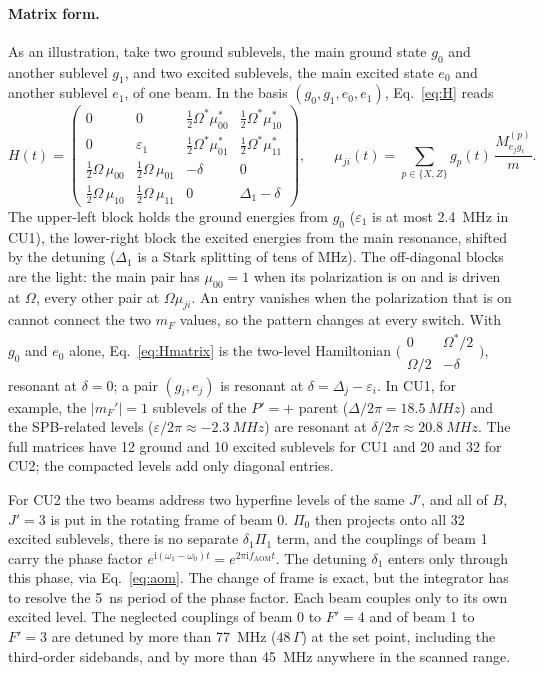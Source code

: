 \documentclass[11pt,a4paper,oneside]{report}
\newcommand{\fAOM}{f_{\mathrm{AOM}}}
\begin{document}
\paragraph{Matrix form.} As an illustration, take two ground sublevels, the main ground state $g_0$ and
another sublevel $g_1$, and two excited sublevels, the main excited state $e_0$ and another sublevel
$e_1$, of one beam. In the basis $(g_0,g_1,e_0,e_1)$, Eq.~\eqref{eq:H} reads
\begin{equation}
  H(t)=\begin{pmatrix}
    0 & 0 & \tfrac12\Omega^*\mu_{00}^* & \tfrac12\Omega^*\mu_{10}^*\\[2pt]
    0 & \varepsilon_1 & \tfrac12\Omega^*\mu_{01}^* & \tfrac12\Omega^*\mu_{11}^*\\[2pt]
    \tfrac12\Omega\,\mu_{00} & \tfrac12\Omega\,\mu_{01} & -\delta & 0\\[2pt]
    \tfrac12\Omega\,\mu_{10} & \tfrac12\Omega\,\mu_{11} & 0 & \Delta_1-\delta
  \end{pmatrix},\qquad
  \mu_{ji}(t)=\sum_{p\in\{X,Z\}}g_p(t)\,\frac{M^{(p)}_{e_jg_i}}{m}.
  \label{eq:Hmatrix}
\end{equation}
The upper-left block holds the ground energies from $g_0$ ($\varepsilon_1$ is at most \SI{2.4}{MHz}
in CU1), the lower-right block the excited energies from the main resonance, shifted by the detuning
($\Delta_1$ is a Stark splitting of tens of MHz). The off-diagonal blocks are the light: the main pair
has $\mu_{00}=1$ when its polarization is on and is driven at $\Omega$, every other pair at
$\Omega\mu_{ji}$. An entry vanishes when the polarization that is on cannot connect the two $m_F$
values, so the pattern changes at every switch. With $g_0$ and $e_0$ alone, Eq.~\eqref{eq:Hmatrix} is
the two-level Hamiltonian
$\bigl(\begin{smallmatrix}0&\Omega^*/2\\\Omega/2&-\delta\end{smallmatrix}\bigr)$, resonant at
$\delta=0$; a pair $(g_i,e_j)$ is resonant at $\delta=\Delta_j-\varepsilon_i$. In CU1, for example,
the $|m_F'|=1$ sublevels of the $P'=+$ parent ($\Delta/2\pi=\SI{18.5}{MHz}$) and the SPB-related levels
($\varepsilon/2\pi\approx-\SI{2.3}{MHz}$) are resonant at $\delta/2\pi\approx\SI{20.8}{MHz}$. The full
matrices have 12 ground and 10 excited sublevels for CU1 and 20 and 32 for CU2; the compacted levels
add only diagonal entries.

For CU2 the two beams address two hyperfine levels
of the same $J'$, and all of $B$, $J'=3$ is put in the rotating frame of beam 0. $\Pi_0$ then
projects onto all 32 excited sublevels, there is no separate $\delta_1\Pi_1$ term, and the couplings
of beam 1 carry the phase factor $e^{\mathrm i(\omega_1-\omega_0)t}=e^{2\pi\mathrm i\fAOM t}$. The
detuning $\delta_1$ enters only through this phase, via Eq.~\eqref{eq:aom}. The change of frame is
exact, but the integrator has to resolve the \SI{5}{ns} period of the phase factor. Each beam couples
only to its own excited level. The neglected couplings of
beam 0 to $F'=4$ and of beam 1 to $F'=3$ are detuned by more than \SI{77}{MHz} ($48\,\Gamma$) at
the set point, including the third-order sidebands, and by more than \SI{45}{MHz} anywhere in the
scanned range.
\end{document}
